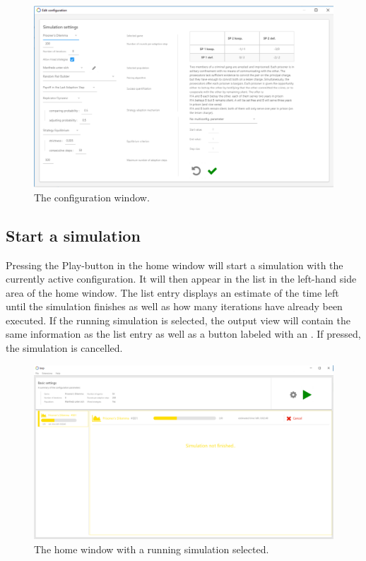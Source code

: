 \documentclass[parskip=full,11pt]{scrartcl}
\newlength\myheight
\newlength\mydepth
\newcommand*\inlinegraphics[1]{%
  \settototalheight\myheight{Xygp}%
  \settodepth\mydepth{Xygp}%
  \raisebox{-1.8\mydepth}{\texttt{[image: \#1]}}%
}
\begin{document}
\begin{figure}
	\centering
	\includegraphics[width=\linewidth]{img_manual/config_window.png}
	\caption{The configuration window.}
	\label{fig:config_window}
\end{figure}

\subsection{Start a simulation}
Pressing the Play-button in the home window will start a simulation with the currently active configuration. It will then appear in the list in the left-hand side area of the home window. The list entry displays an estimate of the time left until the simulation finishes as well as how many iterations have already been executed. If the running simulation is selected, the output view will contain the same information as the list entry as well as a button labeled with an  \inlinegraphics{img_manual/x_button.png}. If pressed, the simulation is cancelled.

\begin{figure}
	\centering
	\includegraphics[width=\linewidth]{img_manual/running_simulation.png}
	\caption{The home window with a running simulation selected.}
	\label{fig:running_simulation}
\end{figure}
\end{document}
